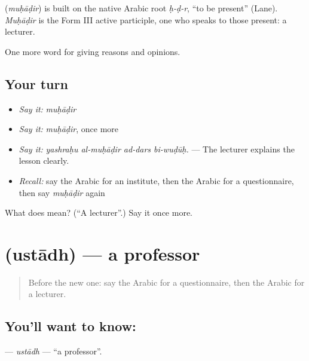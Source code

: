 \begin{cousinweb}
\textbf{} (\emph{muḥāḍir}) is built on the native Arabic root \emph{ḥ-ḍ-r}, \textquotedblleft{}to be present\textquotedblright{} (Lane). \emph{Muḥāḍir} is the Form III active participle, one who speaks to those present: a lecturer.
\end{cousinweb}

\begin{grammarlens}[title={What you've built}]
One more word for giving reasons and opinions.
\end{grammarlens}

\subsection*{Your turn}
\begin{itemize}
\raggedright
  \item \emph{Say it:} \emph{muḥāḍir}
  \item \emph{Say it:} \emph{muḥāḍir}, once more
  \item \emph{Say it:} \emph{yashraḥu al-muḥāḍir ad-dars bi-wuḍūḥ.} — The lecturer explains the lesson clearly.
  \item \emph{Recall:} say the Arabic for an institute, then the Arabic for a questionnaire, then say \emph{muḥāḍir} again
\end{itemize}

\begin{tcolorbox}[breakable,colback=teal!4,colframe=teal!35!black,title={Before you move on}]
What does  mean? (\textquotedblleft{}A lecturer\textquotedblright{}.) Say it once more.
\end{tcolorbox}
\section[\texorpdfstring{\ar{أستاذ} (ustādh)}{أستاذ (ustādh)}]{ (ustādh) — a professor}

\label{lesson:AR-C392-ustadh}



\begin{quote}
Before the new one: say the Arabic for a questionnaire, then the Arabic for a lecturer.
\end{quote}

\subsection*{You'll want to know: }
\textbf{} — \emph{ustādh} — \textquotedblleft{}a professor\textquotedblright{}.

